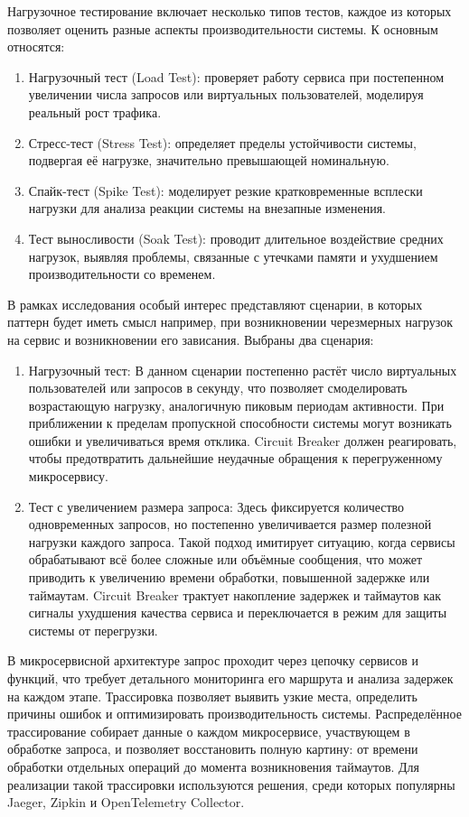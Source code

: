 Нагрузочное тестирование включает несколько типов тестов, каждое из которых позволяет оценить разные аспекты производительности системы. К основным относятся:
\begin{enumerate}
    \item Нагрузочный тест (Load Test): проверяет работу сервиса при постепенном увеличении числа запросов или виртуальных пользователей, моделируя реальный рост трафика.

    \item Стресс-тест (Stress Test): определяет пределы устойчивости системы, подвергая её нагрузке, значительно превышающей номинальную.

    \item Спайк-тест (Spike Test): моделирует резкие кратковременные всплески нагрузки для анализа реакции системы на внезапные изменения.

    \item Тест выносливости (Soak Test): проводит длительное воздействие средних нагрузок, выявляя проблемы, связанные с утечками памяти и ухудшением производительности со временем.
\end{enumerate}
В рамках исследования особый интерес представляют сценарии, в которых паттерн будет иметь смысл например, при возникновении черезмерных нагрузок на сервис и возникновении его зависания. Выбраны два сценария:
\begin{enumerate}
    \item Нагрузочный тест: В данном сценарии постепенно растёт число виртуальных пользователей или запросов в секунду, что позволяет смоделировать возрастающую нагрузку, аналогичную пиковым периодам активности. При приближении к пределам пропускной способности системы могут возникать ошибки и увеличиваться время отклика. Circuit Breaker должен реагировать, чтобы предотвратить дальнейшие неудачные обращения к перегруженному микросервису. 

    \item Тест с увеличением размера запроса: Здесь фиксируется количество одновременных запросов, но постепенно увеличивается размер полезной нагрузки каждого запроса. Такой подход имитирует ситуацию, когда сервисы обрабатывают всё более сложные или объёмные сообщения, что может приводить к увеличению времени обработки, повышенной задержке или таймаутам. Circuit Breaker трактует накопление задержек и таймаутов как сигналы ухудшения качества сервиса и переключается в режим для защиты системы от перегрузки.
  \end{enumerate}
В микросервисной архитектуре запрос проходит через цепочку сервисов и функций, что требует детального мониторинга его маршрута и анализа задержек на каждом этапе. Трассировка позволяет выявить узкие места, определить причины ошибок и оптимизировать производительность системы. Распределённое трассирование собирает данные о каждом микросервисе, участвующем в обработке запроса, и позволяет восстановить полную картину: от времени обработки отдельных операций до момента возникновения таймаутов. Для реализации такой трассировки используются решения, среди которых популярны Jaeger, Zipkin и OpenTelemetry Collector.
